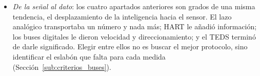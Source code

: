 \begin{itemize}
    \item \emph{De la señal al dato}: los cuatro apartados anteriores son grados de una misma tendencia, el desplazamiento de la inteligencia hacia el sensor. El lazo analógico transportaba un número y nada más; HART le añadió información; los buses digitales le dieron velocidad y direccionamiento; y el TEDS terminó de darle significado. Elegir entre ellos no es buscar el mejor protocolo, sino identificar el eslabón que falta para cada medida (Sección~\ref{sub:criterios_buses}).
\end{itemize}

